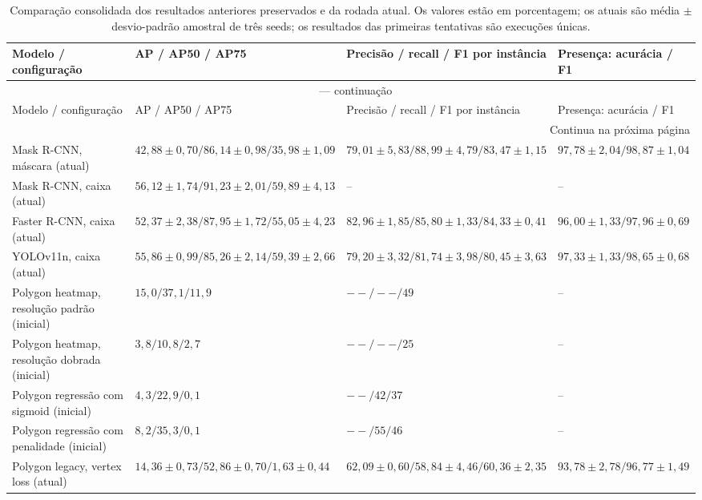 \documentclass[11pt]{article}
\begin{document}
\small
\setlength{\tabcolsep}{2pt}
\renewcommand{\arraystretch}{1.12}
\begin{longtable}{@{}p{3.5cm}p{4.3cm}p{4.8cm}p{2.5cm}@{}}
\caption{Comparação consolidada dos resultados anteriores preservados e da rodada
atual. Os valores estão em porcentagem; os atuais são média $\pm$ desvio-padrão amostral de três seeds;
os resultados das primeiras tentativas são execuções únicas.}
\label{tab:resumo_comparativo}\\
\toprule
Modelo / configuração & AP / AP50 / AP75 & Precisão / recall / F1 por instância &
Presença: acurácia / F1 \\
\midrule
\endfirsthead
\multicolumn{4}{c}{\tablename\ \thetable{} --- continuação}\\
\toprule
Modelo / configuração & AP / AP50 / AP75 & Precisão / recall / F1 por instância &
Presença: acurácia / F1 \\
\midrule
\endhead
\midrule
\multicolumn{4}{r}{Continua na próxima página}\\
\endfoot
\bottomrule
\endlastfoot
Mask R-CNN, máscara (atual) & $42,88\pm0,70\allowbreak / 86,14\pm0,98\allowbreak / 35,98\pm1,09$ & $79,01\pm5,83\allowbreak / 88,99\pm4,79\allowbreak / 83,47\pm1,15$ & $97,78\pm2,04\allowbreak / 98,87\pm1,04$ \\
Mask R-CNN, caixa (atual) & $56,12\pm1,74\allowbreak / 91,23\pm2,01\allowbreak / 59,89\pm4,13$ & -- & -- \\
Faster R-CNN, caixa (atual) & $52,37\pm2,38\allowbreak / 87,95\pm1,72\allowbreak / 55,05\pm4,23$ & $82,96\pm1,85\allowbreak / 85,80\pm1,33\allowbreak / 84,33\pm0,41$ & $96,00\pm1,33\allowbreak / 97,96\pm0,69$ \\
YOLOv11n, caixa (atual) & $55,86\pm0,99\allowbreak / 85,26\pm2,14\allowbreak / 59,39\pm2,66$ & $79,20\pm3,32\allowbreak / 81,74\pm3,98\allowbreak / 80,45\pm3,63$ & $97,33\pm1,33\allowbreak / 98,65\pm0,68$ \\
Polygon heatmap, resolução padrão (inicial) & $15,0 / 37,1 / 11,9$ & $-- / -- / 49$ & -- \\
Polygon heatmap, resolução dobrada (inicial) & $3,8 / 10,8 / 2,7$ & $-- / -- / 25$ & -- \\
Polygon regressão com sigmoid (inicial) & $4,3 / 22,9 / 0,1$ & $-- / 42 / 37$ & -- \\
Polygon regressão com penalidade (inicial) & $8,2 / 35,3 / 0,1$ & $-- / 55 / 46$ & -- \\
Polygon legacy, vertex loss (atual) & $14,36\pm0,73\allowbreak / 52,86\pm0,70\allowbreak / 1,63\pm0,44$ & $62,09\pm0,60\allowbreak / 58,84\pm4,46\allowbreak / 60,36\pm2,35$ & $93,78\pm2,78\allowbreak / 96,77\pm1,49$ \\

\end{longtable}
\end{document}
